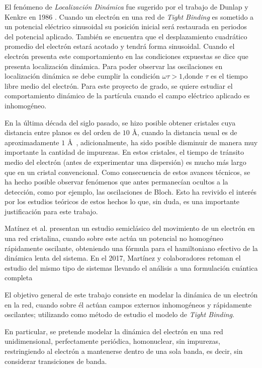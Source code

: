 El fenómeno de \textit{Localización Dinámica} fue sugerido por el trabajo de Dunlap y  Kenkre en 1986 \cite{Dunlap}. Cuando un electrón en una red de \textit{Tight Binding} es sometido a un potencial eléctrico sinusoidal su posición inicial será restaurada en periodos del potencial aplicado. También se encuentra que el desplazamiento cuadrático promedio del electrón estará acotado y tendrá forma sinusoidal. Cuando el electrón presenta este comportamiento en las condiciones expuestas se dice que presenta localización dinámica. Para poder observar las oscilaciones en localización dinámica se debe cumplir la condición $\omega\tau>1$,donde $\tau$ es el tiempo libre medio del electrón. Para este proyecto de grado, se quiere estudiar el comportamiento dinámico de la partícula cuando el campo  eléctrico aplicado es inhomogéneo.

En la última década del siglo pasado, se hizo posible obtener cristales cuya distancia entre planos es del orden de $10$ \AA, cuando la distancia usual es de aproximadamente $1$ \AA$\,$   \cite{wannier2}, adicionalmente, ha sido posible disminuir de manera muy importante la cantidad de impurezas. En estos cristales, el tiempo de tránsito medio del electrón (antes de experimentar una dispersión) es mucho más largo que en un cristal convencional. Como consecuencia de estos avances técnicos, se ha hecho posible observar fenómenos que antes permanecían ocultos a la detección, como  por ejemplo, las oscilaciones de Bloch. Esto ha revivido el interés por los estudios teóricos de estos hechos lo que, sin duda, es una importante justificación para este trabajo. 

Matínez et al.\cite{mart2014} presentan un estudio semiclásico del movimiento de un electrón en una red cristalina, cuando sobre este actúa un potencial no homogéneo rápidamente oscilante, obteniendo una fórmula para el hamiltoniano efectivo de la dinámica lenta del sistema. En el 2017, Martínez y colaboradores retoman el estudio del mismo tipo de sistemas llevando el análisis a una formulación cuántica completa  \cite{martinez2017}

El objetivo general de este trabajo consiste en modelar la dinámica de un electrón en la red, cuando sobre él actúan campos externos inhomogéneos y rápidamente oscilantes; utilizando como método de estudio el modelo de \textit{Tight Binding}. 

En particular, se pretende modelar la dinámica del electrón en una red unidimensional, perfectamente periódica, homonuclear, sin impurezas, restringiendo al electrón a mantenerse dentro de una sola banda, es decir, sin considerar transiciones de banda. 

